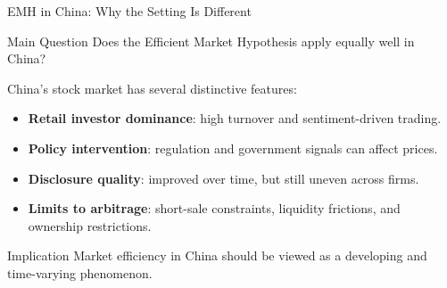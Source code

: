 \begin{frame}{EMH in China: Why the Setting Is Different}

\begin{block}{Main Question}
Does the Efficient Market Hypothesis apply equally well in China?
\end{block}

\vspace{0.2cm}

China's stock market has several distinctive features:

\begin{itemize}
    \item \textbf{Retail investor dominance}: high turnover and sentiment-driven trading.
    \item \textbf{Policy intervention}: regulation and government signals can affect prices.
    \item \textbf{Disclosure quality}: improved over time, but still uneven across firms.
    \item \textbf{Limits to arbitrage}: short-sale constraints, liquidity frictions, and ownership restrictions.
\end{itemize}

\vfill

\begin{alertblock}{Implication}
Market efficiency in China should be viewed as a developing and time-varying phenomenon.
\end{alertblock}

\end{frame}

